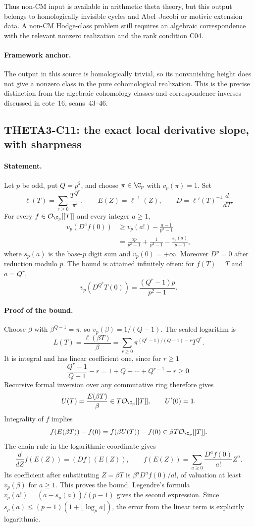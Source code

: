 \documentclass[11pt]{article}
\theoremstyle{definition}\newtheorem{definition}[theorem]{Definition}\newtheorem{remark}[theorem]{Remark}
\begin{document}
Thus non-CM input is available in arithmetic theta theory, but this
output belongs to homologically invisible cycles and
Abel--Jacobi or motivic extension data. A non-CM Hodge-class problem
still requires an algebraic correspondence with the relevant
nonzero realization and the rank condition C04.

\paragraph{Framework anchor.}
The output in this source is homologically trivial, so its nonvanishing
height does not give a nonzero class in the pure cohomological realization.
This is the precise distinction from the algebraic cohomology classes
and correspondence inverses discussed in cote~16, scans~43--46.

\subsection{THETA3-C11: the exact local derivative slope, with sharpness}\label{C11}

\paragraph{Statement.}
Let $p$ be odd, put $Q=p^2$, and choose $\pi\in\C_p$ with
$v_p(\pi)=1$. Set
\[
 \ell(T)=\sum_{r\geq0}\frac{T^{Q^r}}{\pi^r},\qquad
 E(Z)=\ell^{-1}(Z),\qquad D=\ell'(T)^{-1}\frac{d}{dT}.
\]
For every $f\in\mathcal O_{\C_p}[[T]]$ and every integer $a\geq1$,
\begin{align*}
 v_p(D^af(0))
 &\geq v_p(a!)-\frac{a-1}{p^2-1}\\
 &=\frac{ap}{p^2-1}+\frac1{p^2-1}
                     -\frac{s_p(a)}{p-1},
\end{align*}
where $s_p(a)$ is the base-$p$ digit sum and $v_p(0)=+\infty$.
Moreover $D^p=0$ after reduction modulo $p$.
The bound is attained infinitely often: for $f(T)=T$ and $a=Q^r$,
\[
 v_p(D^{Q^r}T(0))=\frac{(Q^r-1)p}{p^2-1}.
\]

\paragraph{Proof of the bound.}
Choose $\beta$ with $\beta^{Q-1}=\pi$, so
$v_p(\beta)=1/(Q-1)$. The scaled logarithm is
\[
 L(T)=\frac{\ell(\beta T)}\beta
 =\sum_{r\geq0}
     \pi^{(Q^r-1)/(Q-1)-r}T^{Q^r}.
\]
It is integral and has linear coefficient one, since for $r\geq1$
\[
 \frac{Q^r-1}{Q-1}-r=1+Q+\cdots+Q^{r-1}-r\geq0.
\]
Recursive formal inversion over any commutative ring therefore gives
\[
 U(T)=\frac{E(\beta T)}\beta
       \in T\mathcal O_{\C_p}[[T]],\qquad U'(0)=1.
\]
Integrality of $f$ implies
\[
 f(E(\beta T))-f(0)=f(\beta U(T))-f(0)
                         \in\beta T\mathcal O_{\C_p}[[T]].
\]
The chain rule in the logarithmic coordinate gives
\[
 \frac{d}{dZ}f(E(Z))=(Df)(E(Z)),\qquad
 f(E(Z))=\sum_{a\geq0}\frac{D^af(0)}{a!}Z^a.
\]
Its coefficient after substituting $Z=\beta T$ is
$\beta^aD^af(0)/a!$, of valuation at least $v_p(\beta)$ for
$a\geq1$. This proves the bound. Legendre's formula
$v_p(a!)=(a-s_p(a))/(p-1)$ gives the second expression. Since
$s_p(a)\leq(p-1)(1+\lfloor\log_pa\rfloor)$, the error from the
linear term is explicitly logarithmic.
\end{document}
